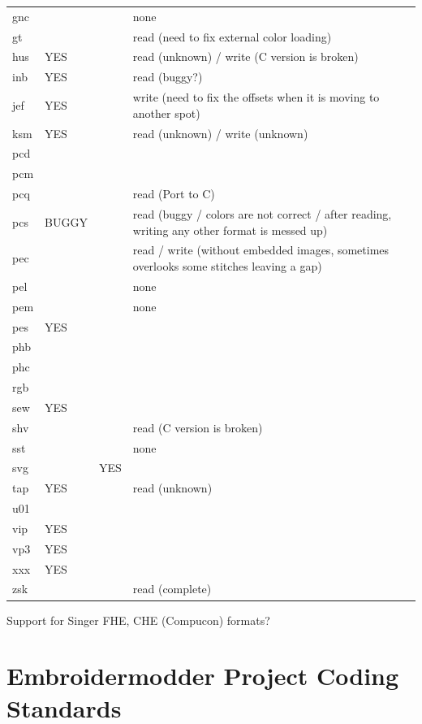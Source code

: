 \documentclass[a4paper, 11pt]{report}
\begin{document}
\begin{longtable}{l l l p{8cm}}
gnc    &       &       & none \\
gt     &       &       & read (need to fix external color loading) \\
hus    & YES   &       & read (unknown) / write (C version is broken) \\
inb    & YES   &       & read (buggy?) \\
jef    & YES   &       & write (need to fix the offsets when it is moving to another spot) \\
ksm    & YES   &       & read (unknown) / write (unknown) \\
pcd    &       &       &  \\
pcm    &       &       & \\
pcq    &       &       & read (Port to C)\\
pcs    & BUGGY &       & read (buggy / colors are not correct / after reading, writing any other format is messed up)\\
pec    &       &       & read / write (without embedded images, sometimes overlooks some stitches leaving a gap)\\
pel    &       &       & none\\
pem    &       &       & none\\
pes    & YES   &       & \\
phb    &       &       & \\
phc    &       &       & \\
rgb    &       &       & \\
sew    & YES   &       & \\
shv    &       &       & read (C version is broken)\\
sst    &       &       & none\\
svg    &       & YES   & \\
tap    & YES   &       & read (unknown)\\
u01    &       &       & \\
vip    & YES   &       & \\
vp3    & YES   &       & \\
xxx    & YES   &       & \\
zsk    &       &       & read (complete)
\end{longtable}

Support for Singer FHE, CHE (Compucon) formats?

\section{Embroidermodder Project Coding Standards}
\end{document}
